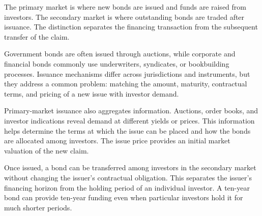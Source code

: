 The primary market is where new bonds are issued and funds are raised from investors. The secondary market is where outstanding bonds are traded after issuance. The distinction separates the financing transaction from the subsequent transfer of the claim.

Government bonds are often issued through auctions, while corporate and financial bonds commonly use underwriters, syndicates, or bookbuilding processes. Issuance mechanisms differ across jurisdictions and instruments, but they address a common problem: matching the amount, maturity, contractual terms, and pricing of a new issue with investor demand.

Primary-market issuance also aggregates information. Auctions, order books, and investor indications reveal demand at different yields or prices. This information helps determine the terms at which the issue can be placed and how the bonds are allocated among investors. The issue price provides an initial market valuation of the new claim.

Once issued, a bond can be transferred among investors in the secondary market without changing the issuer's contractual obligation. This separates the issuer's financing horizon from the holding period of an individual investor. A ten-year bond can provide ten-year funding even when particular investors hold it for much shorter periods.

